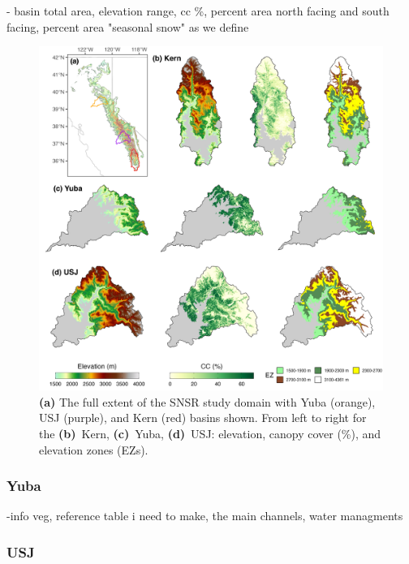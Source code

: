 - basin total area, elevation range, cc \%, percent area north facing and south facing, percent area "seasonal snow" as we define

\begin{figure}[t]
\centering
\includegraphics[width=14cm]{figures/ch2_figs/kuy_study_area_v2.png}
\caption{\textbf{(a)} The full extent of the SNSR study domain with Yuba (orange), USJ (purple), and Kern (red) basins shown. From left to right for the \textbf{(b)}~Kern, \textbf{(c)}~Yuba, \textbf{(d)}~USJ: elevation, canopy cover (\%), and elevation zones (EZs).}
\label{kuy_study_area}
\end{figure}
\hypertarget{ch2-sa-1}{\subsubsection{Yuba}\label{ch2-sa-1}}

-info veg, reference table i need to make, the main channels, water managments

\hypertarget{ch2-sa-2}{\subsubsection{USJ}\label{ch2-sa-2}}


